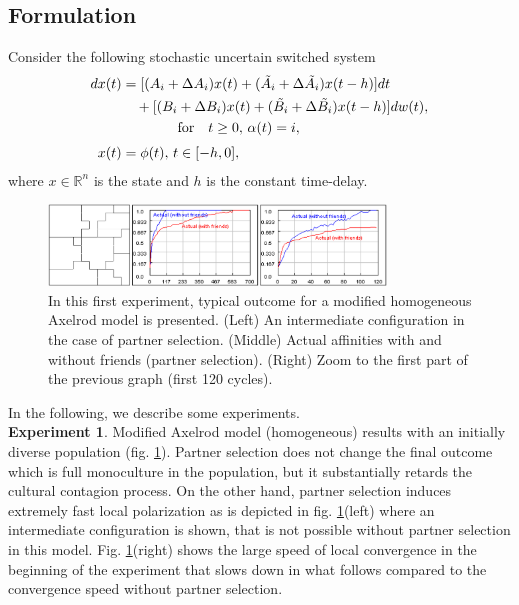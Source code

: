 \documentclass[a4paper,twocolumn,twoside,10pt]{article}
\theoremstyle{definition}
\newcommand{\Real}{\mathbb R}
\begin{document}
\subsection{Formulation}
Consider the following stochastic uncertain switched system
\begin{align}
dx(t)&=[(A_i+\Delta A_i)x(t)+(\tilde{A_i}+\Delta\tilde{
A_i})x(t-h)]dt\nonumber\\
&\quad+[(B_i+\Delta B_i)x(t)+(\tilde{B_i}+\Delta\tilde{
B_i})x(t-h)]dw(t),\notag\\
&\qquad\qquad\text{for}\quad
t\geq0,\,\alpha(t)=i,\label{sw_sy}
\\[1\jot]
x(t)&=\phi(t),\,t\in [-h,0],\nonumber
\end{align}
where $x\in\Real^n$ is the state and $h$ is the constant time-delay.\\

\begin{figure}[htp]
\centering
\includegraphics[width=0.8\textwidth]{experiment1.png}
\caption{In this first experiment, typical outcome for a modified homogeneous Axelrod model is presented. (Left) An intermediate configuration in the case of partner selection. (Middle) Actual affinities with and without friends (partner selection). (Right) Zoom to the first part of the previous graph (first 120 cycles).}
\label{experiment1} 
\end{figure}

In the following, we describe some experiments.\\

\textbf{Experiment 1}. Modified Axelrod model (homogeneous) results with an initially diverse population
(fig. \ref{experiment1}). Partner selection does not change the final outcome which is full monoculture in the
population, but it substantially retards the cultural contagion process. On the other hand, partner
selection induces extremely fast local polarization as is depicted in fig. \ref{experiment1}(left) where an intermediate
configuration is shown, that is not possible without partner selection in this model. Fig. \ref{experiment1}(right)
shows the large speed of local convergence in the beginning of the experiment that slows down in
what follows compared to the convergence speed without partner selection.\\
\end{document}
